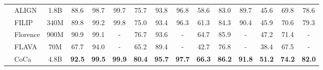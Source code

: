 \documentclass{article}
\begin{document}
\begin{table*}[]
{\begin{tabular}{@{}llccccccccccccc@{}}
\multicolumn{1}{c}{}                    & \multicolumn{1}{l|}{ALIGN}       & \multicolumn{1}{c|}{1.8B}     & 88.6          & 98.7           & \multicolumn{1}{c|}{99.7}           & 75.7          & 93.8          & \multicolumn{1}{c|}{96.8}          & 58.6          & 83.0          & \multicolumn{1}{c|}{89.7}          & 45.6                & 69.8          & 78.6          \\
\multicolumn{1}{c}{}                    & \multicolumn{1}{l|}{FILIP}       & \multicolumn{1}{c|}{340M}     & 89.8          & 99.2           & \multicolumn{1}{c|}{99.8}           & 75.0          & 93.4          & \multicolumn{1}{c|}{96.3}          & 61.3          & 84.3          & \multicolumn{1}{c|}{90.4}          & 45.9       & 70.6          & 79.3          \\
\multicolumn{1}{c}{}                    &\multicolumn{1}{l|}{Florence} & \multicolumn{1}{c|}{900M} & 90.9 & 99.1 & \multicolumn{1}{c|}{-} & 76.7 & 93.6 & \multicolumn{1}{c|}{-} & 64.7 & 85.9 & \multicolumn{1}{c|}{-} & 47.2 & 71.4 & - \\
\multicolumn{1}{c}{}                    &\multicolumn{1}{l|}{FLAVA} & \multicolumn{1}{c|}{70M} & 67.7 & 94.0 & \multicolumn{1}{c|}{-} & 65.2 & 89.4 & \multicolumn{1}{c|}{-} & 42.7 & 76.8 & \multicolumn{1}{c|}{-} & 38.4 & 67.5 & - \\
\multicolumn{1}{c}{}                    &\multicolumn{1}{l|}{CoCa} & \multicolumn{1}{c|}{4.8B} & \textbf{92.5} & \textbf{99.5} & \multicolumn{1}{c|}{\textbf{99.9}} & \textbf{80.4} & \textbf{95.7} & \multicolumn{1}{c|}{\textbf{97.7}} & \textbf{66.3} & \textbf{86.2 }& \multicolumn{1}{c|}{\textbf{91.8}} & \textbf{51.2} & \textbf{74.2} &\textbf{ 82.0} \\


\end{tabular}}
\end{table*}
\end{document}

